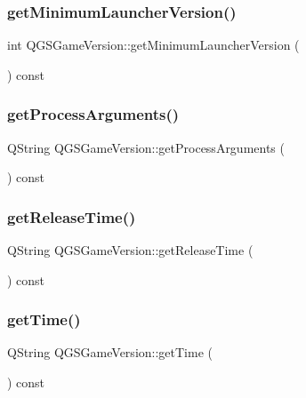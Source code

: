 \subsubsection{\texorpdfstring{get\+Minimum\+Launcher\+Version()}{getMinimumLauncherVersion()}}
{\footnotesize\ttfamily int Q\+G\+S\+Game\+Version\+::get\+Minimum\+Launcher\+Version (\begin{DoxyParamCaption}{ }\end{DoxyParamCaption}) const}

\mbox{\label{class_q_g_s_game_version_a630eb4b0ac8b01a0b539e4a2a02e9c56}} 
\subsubsection{\texorpdfstring{get\+Process\+Arguments()}{getProcessArguments()}}
{\footnotesize\ttfamily Q\+String Q\+G\+S\+Game\+Version\+::get\+Process\+Arguments (\begin{DoxyParamCaption}{ }\end{DoxyParamCaption}) const}

\mbox{\label{class_q_g_s_game_version_a8c62c0e94d34b221198f3a77b2425da8}} 
\subsubsection{\texorpdfstring{get\+Release\+Time()}{getReleaseTime()}}
{\footnotesize\ttfamily Q\+String Q\+G\+S\+Game\+Version\+::get\+Release\+Time (\begin{DoxyParamCaption}{ }\end{DoxyParamCaption}) const}

\mbox{\label{class_q_g_s_game_version_a75295a6b6d7b8d28bd048e18924c56ad}} 
\subsubsection{\texorpdfstring{get\+Time()}{getTime()}}
{\footnotesize\ttfamily Q\+String Q\+G\+S\+Game\+Version\+::get\+Time (\begin{DoxyParamCaption}{ }\end{DoxyParamCaption}) const}

